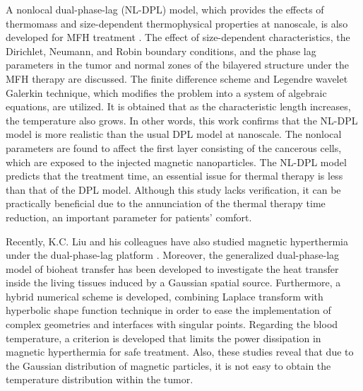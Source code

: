 \documentclass[sn-mathphys]{sn-jnl}%
\theoremstyle{thmstyleone}%
\theoremstyle{thmstyletwo}%
\theoremstyle{thmstylethree}%
\begin{document}
{A nonlocal dual-phase-lag (NL-DPL) model, which provides the effects of thermomass and size-dependent thermophysical properties at nanoscale, is also developed for MFH treatment \cite{Kumar20164,RKumar20192}. The effect of size-dependent characteristics, the Dirichlet, Neumann, and Robin boundary conditions, and the phase lag parameters in the tumor and normal zones of the bilayered structure under the MFH therapy are discussed. The finite difference scheme and Legendre wavelet Galerkin technique, which modifies the problem into a system of algebraic equations, are utilized. It is obtained that as the characteristic length increases, the temperature also grows. In other words, this work confirms that the NL-DPL model is more realistic than the usual DPL model at nanoscale. The nonlocal parameters are found to affect the first layer consisting of the cancerous cells, which are exposed to the injected magnetic nanoparticles. The NL-DPL model predicts that the treatment time, an essential issue for thermal therapy is less than that of the DPL model. Although this study lacks verification, it can be practically beneficial due to the annunciation of the thermal therapy time reduction, an important parameter for patients' comfort.

Recently, K.C. Liu and his colleagues have also studied magnetic hyperthermia under the dual-phase-lag platform \cite{KCLiu2018,KCLiu2019,KCLiu2020}. Moreover, the generalized dual-phase-lag model of bioheat transfer has been developed to investigate the heat transfer inside the living tissues induced by a Gaussian spatial source. Furthermore, a hybrid numerical scheme is developed, combining Laplace transform with hyperbolic shape function technique in order to ease the implementation of complex geometries and interfaces with singular points. Regarding the blood temperature, a criterion is developed that limits the power dissipation in magnetic hyperthermia for safe treatment.
Also, these studies reveal that due to the Gaussian distribution of magnetic particles, it is not easy to obtain the temperature distribution within the tumor.

}
\end{document}
